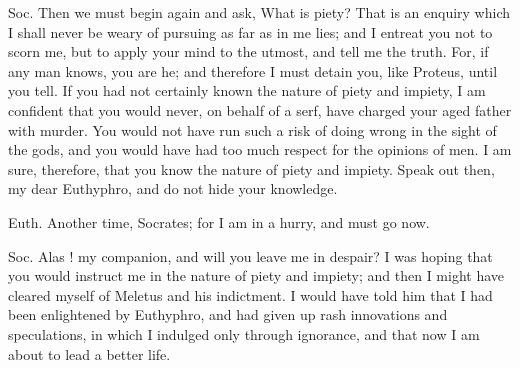 Soc. Then we must begin again and ask, What is piety? That is an enquiry which I shall never be weary of pursuing as far as in me lies; and I entreat you not to scorn me, but to apply your mind to the utmost, and tell me the truth. For, if any man knows, you are he; and therefore I must detain you, like Proteus, until you tell. If you had not certainly known the nature of piety and impiety, I am confident that you would never, on behalf of a serf, have charged your aged father with murder. You would not have run such a risk of doing wrong in the sight of the gods, and you would have had too much respect for the opinions of men. I am sure, therefore, that you know the nature of piety and impiety. Speak out then, my dear Euthyphro, and do not hide your knowledge.

Euth. Another time, Socrates; for I am in a hurry, and must go now.

Soc. Alas ! my companion, and will you leave me in despair? I was hoping that you would instruct me in the nature of piety and impiety; and then I might have cleared myself of Meletus and his indictment. I would have told him that I had been enlightened by Euthyphro, and had given up rash innovations and speculations, in which I indulged only through ignorance, and that now I am about to lead a better life.



